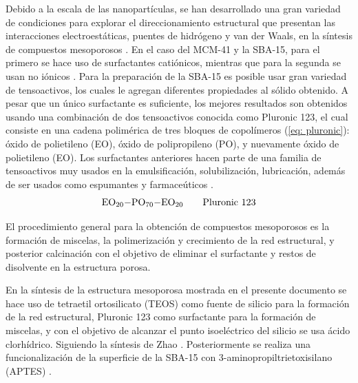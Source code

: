 \documentclass[fleqn, 12pt]{SelfArx}
\begin{document}
Debido a la escala de las nanopart\'iculas, se han desarrollado una gran variedad de condiciones para explorar el direccionamiento estructural que presentan las interacciones electroest\'aticas, puentes de hidr\'ogeno y van der Waals, en la s\'intesis de compuestos mesoporosos \cite{zhao_1998}. En el caso del MCM-41 y la SBA-15, para el primero se hace uso de surfactantes cati\'onicos, mientras que para la segunda se usan no i\'onicos \cite{zhao_1998}. Para la preparaci\'on de la SBA-15 es posible usar gran variedad de tensoactivos, los cuales le agregan diferentes propiedades al s\'olido obtenido. A pesar que un \'unico surfactante es suficiente, los mejores resultados son obtenidos usando una combinaci\'on de dos tensoactivos conocida como Pluronic 123, el cual consiste en una cadena polim\'erica de tres bloques de copol\'imeros (\autoref{eq: pluronic}): \'oxido de polietileno (EO), \'oxido de polipropileno (PO), y nuevamente \'oxido de polietileno (EO). Los surfactantes anteriores hacen parte de una familia de tensoactivos muy usados en la emulsificaci\'on, solubilizaci\'on, lubricaci\'on, adem\'as de ser usados como espumantes y farmace\'uticos \cite{zhao_1998}.
\begin{equation} \label{eq: pluronic}
    \ce{EO_{20}-PO_{70}-EO_{20}} \qquad \text{Pluronic 123}
\end{equation}

El procedimiento general para la obtenci\'on de compuestos mesoporosos es la formaci\'on de miscelas, la polimerizaci\'on y crecimiento de la red estructural, y posterior calcinaci\'on con el objetivo de eliminar el surfactante y restos de disolvente en la estructura porosa.

En la s\'intesis de la estructura mesoporosa mostrada en el presente documento se hace uso de tetraetil ortosilicato (TEOS) como fuente de silicio para la formaci\'on de la red estructural, Pluronic 123 como surfactante para la formaci\'on de miscelas, y con el objetivo de alcanzar el punto isoel\'ectrico del silicio se usa \'acido clorh\'idrico. Siguiendo la s\'intesis de Zhao \cite{zhao_1998}. Posteriormente se realiza una funcionalizaci\'on de la superficie de la SBA-15 con 3-aminopropiltrietoxisilano (APTES) \cite{vargas_legnoverde_giraldo_basaldella_moreno-pirajan_2010}.
\end{document}
